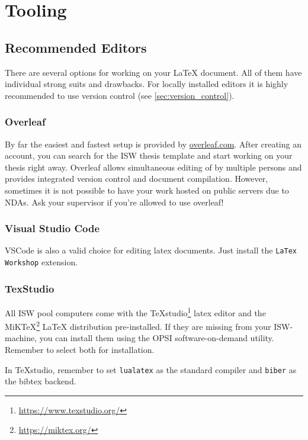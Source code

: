 \chapter{Tooling}

\section{Recommended Editors}
There are several options for working on your LaTeX document. All of them have individual strong suits and drawbacks. For locally installed editors it is highly recommended to use version control (see \autoref{sec:version_control}).

\subsection{Overleaf}
By far the easiest and fastest setup is provided by \url{overleaf.com}. After creating an account, you can search for the \ac{ISW} thesis template and start working on your thesis right away. Overleaf allows simultaneous editing of by multiple persons and provides integrated version control and document compilation.
However, sometimes it is not possible to have your work hosted on public servers due to \acp{NDA}. Ask your supervisor if you're allowed to use overleaf!

\subsection{Visual Studio Code}
VSCode is also a valid choice for editing latex documents. Just install the \texttt{LaTex Workshop} extension.

\subsection{TexStudio}
All \ac{ISW} pool computers come with the TeXstudio\footnote{\url{https://www.texstudio.org/}} latex editor and the MiKTeX\footnote{\url{https://miktex.org/}} LaTeX distribution pre-installed. If they are missing from your \ac{ISW}-machine, you can install them using the OPSI software-on-demand utility. Remember to select both for installation.

In TeXstudio, remember to set \texttt{lualatex} as the standard compiler and \texttt{biber} as the bibtex backend.

